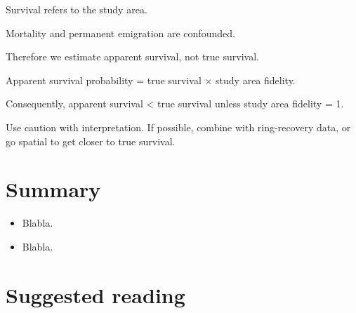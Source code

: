 \documentclass[
  12pt,
]{krantz}
\begin{document}
Survival refers to the study area.

Mortality and permanent emigration are confounded.

Therefore we estimate apparent survival, not true survival.

Apparent survival probability = true survival × study area fidelity.

Consequently, apparent survival \textless{} true survival unless study area fidelity = 1.

Use caution with interpretation. If possible, combine with ring-recovery data, or go spatial to get closer to true survival.

\hypertarget{summary-3}{%
\section{Summary}\label{summary-3}}

\begin{itemize}
\item
  Blabla.
\item
  Blabla.
\end{itemize}

\hypertarget{suggested-reading-3}{%
\section{Suggested reading}\label{suggested-reading-3}}
\end{document}
